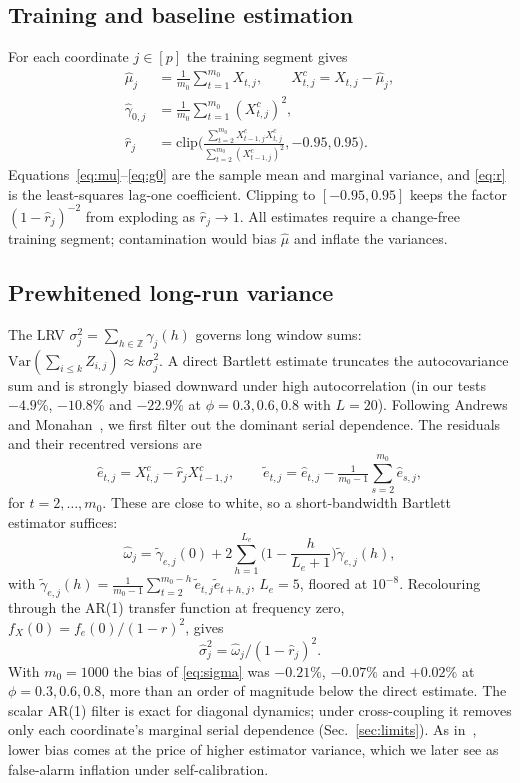 \documentclass[conference]{IEEEtran}
\begin{document}
\subsection{Training and baseline estimation}
For each coordinate $j\in[p]$ the training segment gives
\begin{align}
\hat\mu_j&=\tfrac{1}{m_0}\textstyle\sum_{t=1}^{m_0}X_{t,j},\qquad X^c_{t,j}=X_{t,j}-\hat\mu_j, \label{eq:mu}\\
\hat\gamma_{0,j}&=\tfrac{1}{m_0}\textstyle\sum_{t=1}^{m_0}(X^c_{t,j})^2, \label{eq:g0}\\
\hat r_j&=\mathrm{clip}\Big(\frac{\sum_{t=2}^{m_0}X^c_{t-1,j}X^c_{t,j}}{\sum_{t=2}^{m_0}(X^c_{t-1,j})^2},-0.95,0.95\Big). \label{eq:r}
\end{align}
Equations~\eqref{eq:mu}--\eqref{eq:g0} are the sample mean and marginal variance, and \eqref{eq:r} is the least-squares lag-one coefficient. Clipping to $[-0.95,0.95]$ keeps the factor $(1-\hat r_j)^{-2}$ from exploding as $\hat r_j\to 1$. All estimates require a change-free training segment; contamination would bias $\hat\mu$ and inflate the variances.

\subsection{Prewhitened long-run variance}
The LRV $\sigma_j^2=\sum_{h\in\mathbb{Z}}\gamma_j(h)$ governs long window sums: $\mathrm{Var}(\sum_{i\le k}Z_{i,j})\approx k\sigma_j^2$. A direct Bartlett estimate truncates the autocovariance sum and is strongly biased downward under high autocorrelation (in our tests $-4.9\%$, $-10.8\%$ and $-22.9\%$ at $\phi=0.3,0.6,0.8$ with $L=20$). Following Andrews and Monahan~\cite{andrews1992}, we first filter out the dominant serial dependence. The residuals and their recentred versions are
\begin{equation}
\hat e_{t,j}=X^c_{t,j}-\hat r_jX^c_{t-1,j},\qquad \tilde e_{t,j}=\hat e_{t,j}-\tfrac{1}{m_0-1}\textstyle\sum_{s=2}^{m_0}\hat e_{s,j}, \label{eq:resid}
\end{equation}
for $t=2,\dots,m_0$. These are close to white, so a short-bandwidth Bartlett estimator suffices:
\begin{equation}
\hat\omega_j=\tilde\gamma_{e,j}(0)+2\sum_{h=1}^{L_e}\Big(1-\frac{h}{L_e+1}\Big)\tilde\gamma_{e,j}(h), \label{eq:omega}
\end{equation}
with $\tilde\gamma_{e,j}(h)=\frac{1}{m_0-1}\sum_{t=2}^{m_0-h}\tilde e_{t,j}\tilde e_{t+h,j}$, $L_e=5$, floored at $10^{-8}$. Recolouring through the AR(1) transfer function at frequency zero, $f_X(0)=f_e(0)/(1-r)^2$, gives
\begin{equation}
\hat\sigma_j^2=\hat\omega_j/(1-\hat r_j)^2. \label{eq:sigma}
\end{equation}
With $m_0=1000$ the bias of \eqref{eq:sigma} was $-0.21\%$, $-0.07\%$ and $+0.02\%$ at $\phi=0.3,0.6,0.8$, more than an order of magnitude below the direct estimate. The scalar AR(1) filter is exact for diagonal dynamics; under cross-coupling it removes only each coordinate's marginal serial dependence (Sec.~\ref{sec:limits}). As in~\cite{andrews1992}, lower bias comes at the price of higher estimator variance, which we later see as false-alarm inflation under self-calibration.
\end{document}
